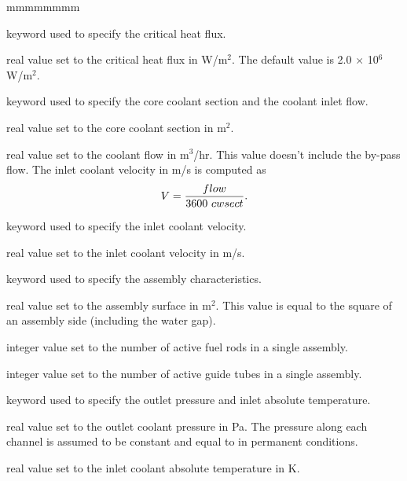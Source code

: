 \begin{ListeDeDescription}{mmmmmmmm}
\item[\moc{CRITFL}] keyword used to specify the critical heat flux.

\item[\dusa{cflux}] real value set to the critical heat flux in W/m$^2$. The default value is 2.0
$\times$ 10$^6$ W/m$^2$.

\item[\moc{CWSECT}] keyword used to specify the core coolant section and the coolant inlet flow.

\item[\dusa{sect}] real value set to the core coolant section in m$^2$.

\item[\dusa{flow}] real value set to the coolant flow in m$^3$/hr. This value doesn't include the by-pass flow.
The inlet coolant velocity in m/s is computed as $$V={{\sl flow} \over 3600 \ {\sl cwsect}}.$$

\item[\moc{SPEED}] keyword used to specify the inlet coolant velocity.

\item[\dusa{velocity}] real value set to the inlet coolant velocity in m/s.

\item[\moc{ASSMB}] keyword used to specify the assembly characteristics.

\item[\dusa{sass}] real value set to the assembly surface in m$^2$. This value is equal to the square of
an assembly side (including the water gap).

\item[\dusa{nbf}] integer value set to the number of active fuel rods in a single assembly.

\item[\dusa{nbg}] integer value set to the number of active guide tubes in a single assembly.

\item[\moc{INLET}] keyword used to specify the outlet pressure and inlet absolute temperature.

\item[\dusa{poutlet}] real value set to the outlet coolant pressure in Pa. The pressure along each channel is assumed to be
constant and equal to  in permanent conditions.

\item[\dusa{tinlet}] real value set to the inlet coolant absolute temperature in K.


\end{ListeDeDescription}
